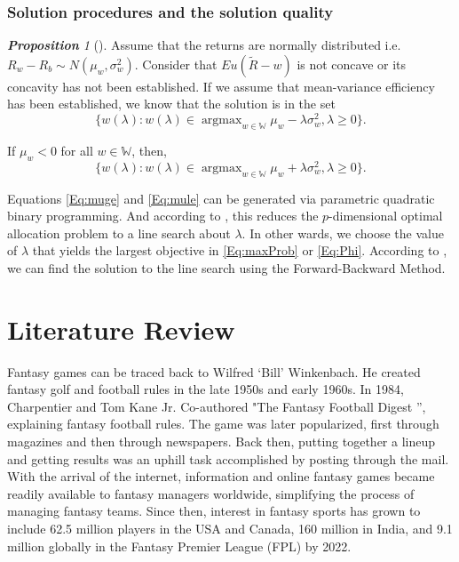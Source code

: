 \documentclass[12pt,oneside,a4paper]{book}
\theoremstyle{definition}
\theoremstyle{remark}
\newtheorem{propn}{\bf Proposition}[section]
\DeclareMathOperator*{\argmax}{argmax}
\begin{document}
			\subsection{Solution procedures and the solution quality} \label{sec:sol_to_mean_var}
				\begin{propn}[\cite{morton2003optimizing}]

					Assume that the returns are normally distributed i.e. $R_w-R_b \sim N(\mu_w,\sigma_w^2)$. Consider that $Eu(\tilde{R}-w)$ is not concave or its concavity has not been established. If we assume that mean-variance efficiency has been established, we know that the solution is in the set
					\begin{equation}\label{Eq:muge}
						\{ w(\lambda):w(\lambda) \in \argmax_{w\in \mathbb{W}} \mu_w - \lambda\sigma_w^2, \lambda \ge0 \}.
					\end{equation}

					If $\mu_w <0$ for all $w\in \mathbb{W}$, then,
					\begin{equation}\label{Eq:mule}
						\{ w(\lambda):w(\lambda) \in \argmax_{w\in \mathbb{W}} \mu_w + \lambda\sigma_w^2, \lambda \ge0 \}.
					\end{equation}
				\end{propn}

				Equations \eqref{Eq:muge} and \eqref{Eq:mule} can be generated via parametric quadratic binary programming. And according to \cite{morton2003optimizing}, this reduces the $p$-dimensional optimal allocation problem to a line search about $\lambda$. In other wards, we choose the value of $\lambda$ that yields the largest objective in \eqref{Eq:maxProb} or \eqref{Eq:Phi}. According to \cite{sun2006optimization}, we can find the solution to the line search using the Forward-Backward Method.



		\chapter{Literature Review}
			Fantasy games can be traced back to Wilfred ‘Bill’ Winkenbach. He created fantasy golf and football rules in the late 1950s and early 1960s. In 1984, Charpentier and Tom Kane Jr. Co-authored "The Fantasy Football Digest '', explaining fantasy football rules. The game was later popularized, first through magazines and then through newspapers.  Back then, putting together a lineup and getting results was an uphill task accomplished by posting through the mail. With the arrival of the internet, information and online fantasy games became readily available to fantasy managers worldwide, simplifying the process of managing fantasy teams. Since then, interest in fantasy sports has grown to include 62.5 million players in the USA and Canada\cite{IndustryResearch}, 160 million in India, and 9.1 million globally in the Fantasy Premier League (FPL) by 2022\cite{HowManyPeople2022}.
\end{document}
